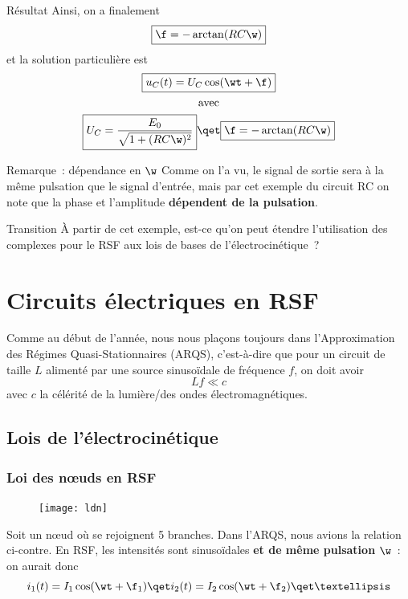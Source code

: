 \documentclass[../main/main.tex]{subfiles}
\begin{document}
\begin{rprop}{Résultat}
    Ainsi, on a finalement
    \[\boxed{\f = -\arctan(RC\w)}\]
    et la solution particulière est
    \begin{gather*}
        \boxed{u_C (t) = U_C\cos(\wt + \f)}\\
        \text{avec}\\
        \boxed{U_C = \frac{E_0}{\sqrt{1+(RC\w)^2}}}
        \qet
        \boxed{\f = -\arctan(RC\w)}
    \end{gather*}
\end{rprop}

\begin{NCrapp}[]{Remarque~: dépendance en $\w$}
    Comme on l'a vu, le signal de sortie sera à la même pulsation que le signal
    d'entrée, mais par cet exemple du circuit RC on note que la phase et
    l'amplitude \textbf{dépendent de la pulsation}.
\end{NCrapp}

\begin{instruc}[trans]{Transition}
    À partir de cet exemple, est-ce qu'on peut étendre l'utilisation des
    complexes pour le RSF aux lois de bases de l'électrocinétique~?
\end{instruc}

\section{Circuits électriques en RSF}
Comme au début de l'année, nous nous plaçons toujours dans l'Approximation des
Régimes Quasi-Stationnaires (ARQS), c'est-à-dire que pour un circuit de taille
$L$ alimenté par une source sinusoïdale de fréquence $f$, on doit avoir
\[\boxed{Lf \ll c}\]
avec $c$ la célérité de la lumière/des ondes électromagnétiques.

\subsection{Lois de l'électrocinétique}
\subsubsection{Loi des nœuds en RSF}
\begin{figure}
    \vspace*{-40pt}
    \centering
    \texttt{[image: ldn]}
\end{figure}
Soit un nœud où se rejoignent 5 branches. Dans l'ARQS, nous avions
la relation ci-contre. En RSF, les intensités sont sinusoïdales \textbf{et
de même pulsation} $\w$~: on aurait donc
\[
    i_1(t) = I_1\cos(\wt+\f_1)
    \qet
    i_2(t) = I_2\cos(\wt+\f_2)
    \qet
    …
\]
\end{document}
